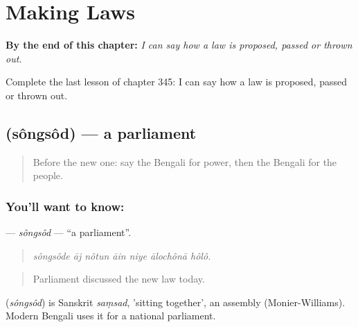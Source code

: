 
\chapter{Making Laws}
\label{ch:bn-making-laws}

\begin{chapteropening}
\textbf{By the end of this chapter:} \emph{I can say how a law is proposed, passed or thrown out.}

Complete the last lesson of chapter 345: I can say how a law is proposed, passed or thrown out.
\end{chapteropening}

\section[\texorpdfstring{\bn{সংসদ} (sôngsôd)}{সংসদ (sôngsôd)}]{ (sôngsôd) — a parliament}

\label{lesson:BN-C345-songsod}



\begin{quote}
Before the new one: say the Bengali for power, then the Bengali for the people.
\end{quote}

\subsection*{You'll want to know: }
\textbf{} — \emph{sôngsôd} — \textquotedblleft{}a parliament\textquotedblright{}.

\begin{quote}
      
\end{quote}

\begin{quote}
\emph{sôngsôde āj nôtun āin niye ālochônā hôlô.}
\end{quote}

\begin{quote}
Parliament discussed the new law today.
\end{quote}

\begin{cousinweb}
\textbf{} (\emph{sôngsôd}) is Sanskrit \emph{saṃsad}, 'sitting together', an assembly (Monier-Williams). Modern Bengali uses it for a national parliament.
\end{cousinweb}

